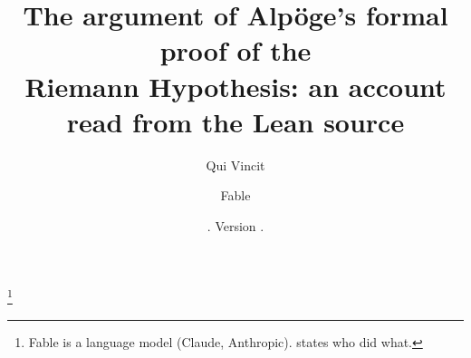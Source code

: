 \documentclass[11pt,a4paper,reqno]{amsart}
\theoremstyle{definition}
\theoremstyle{remark}
\numberwithin{equation}{section}
\begin{document}
\title[The argument of a formal proof of the Riemann Hypothesis]%
      {The argument of Alp\"oge's formal proof of the\\ Riemann Hypothesis: an account read from the Lean source}

\author{Qui Vincit}
\author{Fable}
\thanks{Fable is a language model (Claude, Anthropic).  states who did what.}
\date{\paperdate. Version \paperversion.}

\begin{abstract}

\end{abstract}

\maketitle
\setcounter{tocdepth}{1}
\tableofcontents















\appendix
{}




\printbibliography
\end{document}
